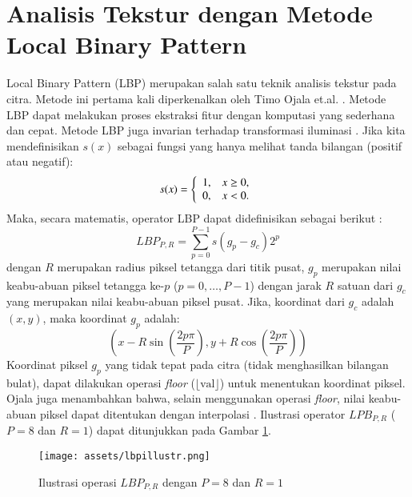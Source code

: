 \documentclass[review,3p,12pt]{elsarticle}
\begin{document}
\section{Analisis Tekstur dengan Metode Local Binary Pattern}
\label{lbp}

Local Binary Pattern (LBP) merupakan salah satu teknik analisis tekstur pada citra. Metode ini pertama kali diperkenalkan oleh Timo Ojala et.al. \cite{ojala1996comparative}. Metode LBP dapat melakukan proses ekstraksi fitur dengan komputasi yang sederhana dan cepat. Metode LBP juga invarian terhadap transformasi iluminasi \cite{ojala2002multiresolution}. Jika kita mendefinisikan $s(x)$ sebagai fungsi yang hanya melihat tanda bilangan (positif atau negatif):
\begin{equation}
s(x) = \left\{
	\begin{array}{l l}
		1,& x \geq 0, \\
		0,& x < 0.
	\end{array}
	\right.
\end{equation}
Maka, secara matematis, operator LBP dapat didefinisikan sebagai berikut \cite{ojala2002multiresolution}:
\begin{equation}
LBP_{P,R} = \sum_{p=0}^{P-1} s(g_p - g_c) 2^p
\end{equation}
dengan $R$ merupakan radius piksel tetangga dari titik pusat, $g_p$ merupakan nilai keabu-abuan piksel tetangga ke-$p$ ($p = 0,\dots,P-1$) dengan jarak $R$ satuan dari $g_c$ yang merupakan nilai keabu-abuan piksel pusat. Jika, koordinat dari $g_c$ adalah $(x,y)$, maka koordinat $g_p$ adalah:
\begin{equation}
(x-R\sin(\frac{2p\pi}{P}), y+R\cos(\frac{2p\pi}{P}))
\end{equation}
Koordinat piksel $g_p$ yang tidak tepat pada citra (tidak menghasilkan bilangan bulat), dapat dilakukan operasi \textit{floor} ($\lfloor {\text{val}} \rfloor$) untuk menentukan koordinat piksel. Ojala juga menambahkan bahwa, selain menggunakan operasi \textit{floor}, nilai keabu-abuan piksel dapat ditentukan dengan interpolasi \cite{ojala2002multiresolution}. Ilustrasi operator $LPB_{P,R}$ ($P=8$ dan $R=1$) dapat ditunjukkan pada Gambar \ref{fig:lbpillustr}. 

\begin{figure}[hbt!]
\caption{Ilustrasi operasi $LBP_{P,R}$ dengan $P=8$ dan $R=1$}
\label{fig:lbpillustr}
\centering
	\texttt{[image: assets/lbpillustr.png]}
\end{figure}
\end{document}
